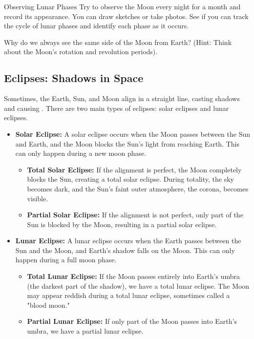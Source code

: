 \begin{example}{Observing Lunar Phases}
Try to observe the Moon every night for a month and record its appearance. You can draw sketches or take photos. See if you can track the cycle of lunar phases and identify each phase as it occurs.
\end{example}

\begin{stopandthink}
Why do we always see the same side of the Moon from Earth? (Hint: Think about the Moon's rotation and revolution periods).
\end{stopandthink}


\subsection{Eclipses: Shadows in Space}

Sometimes, the Earth, Sun, and Moon align in a straight line, casting shadows and causing . There are two main types of eclipses: solar eclipses and lunar eclipses.

\begin{itemize}
    \item \textbf{Solar Eclipse:} A solar eclipse occurs when the Moon passes between the Sun and Earth, and the Moon blocks the Sun's light from reaching Earth.  This can only happen during a new moon phase.
        \begin{itemize}
            \item \textbf{Total Solar Eclipse:} If the alignment is perfect, the Moon completely blocks the Sun, creating a total solar eclipse.  During totality, the sky becomes dark, and the Sun's faint outer atmosphere, the corona, becomes visible.
            \item \textbf{Partial Solar Eclipse:} If the alignment is not perfect, only part of the Sun is blocked by the Moon, resulting in a partial solar eclipse.
        \end{itemize}
    \item \textbf{Lunar Eclipse:} A lunar eclipse occurs when the Earth passes between the Sun and the Moon, and Earth's shadow falls on the Moon. This can only happen during a full moon phase.
        \begin{itemize}
            \item \textbf{Total Lunar Eclipse:} If the Moon passes entirely into Earth's umbra (the darkest part of the shadow), we have a total lunar eclipse. The Moon may appear reddish during a total lunar eclipse, sometimes called a "blood moon."
            \item \textbf{Partial Lunar Eclipse:} If only part of the Moon passes into Earth's umbra, we have a partial lunar eclipse.
        \end{itemize}
\end{itemize}


